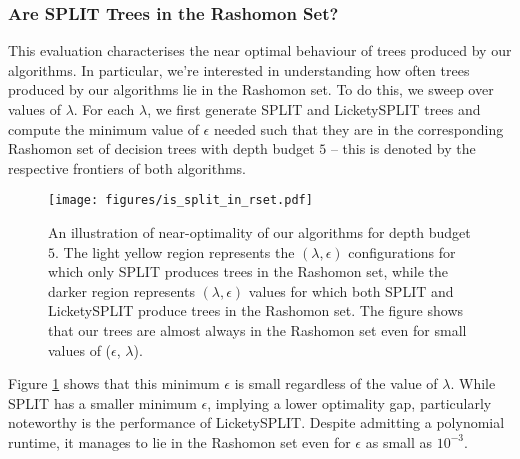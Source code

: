 \subsubsection{Are SPLIT Trees in the Rashomon Set?}
This evaluation characterises the near optimal behaviour of trees produced by our algorithms. In particular, we're interested in understanding how often trees produced by our algorithms lie in the Rashomon set. To do this, we sweep over values of $\lambda$. For each $\lambda$, we first generate SPLIT and LicketySPLIT trees and compute the minimum value of $\epsilon$ needed such that they are in the corresponding Rashomon set of decision trees with depth budget $5$ -- this is denoted by the respective frontiers of both algorithms. 
\begin{figure}[H]
    \centering
    \texttt{[image: figures/is\_split\_in\_rset.pdf]}
    \caption{An illustration of near-optimality of our algorithms for depth budget $5$. The light yellow region represents the $(\lambda, \epsilon)$ configurations for which only SPLIT produces trees in the Rashomon set, while the darker region represents $(\lambda, \epsilon)$ values for which both SPLIT and LicketySPLIT produce trees in the Rashomon set. The figure shows that our trees are almost always in the Rashomon set even for small values of ($\epsilon$, $\lambda$). }
    \label{fig:lookahead_in_rset}
\end{figure}
Figure \ref{fig:lookahead_in_rset} shows that this minimum $\epsilon$ is small regardless of the value of $\lambda$.  While SPLIT has a smaller minimum $\epsilon$, implying a lower optimality gap, particularly noteworthy is the performance of LicketySPLIT. Despite admitting a polynomial runtime, it manages to lie in the Rashomon set even for $\epsilon$ as small as $10^{-3}$.
